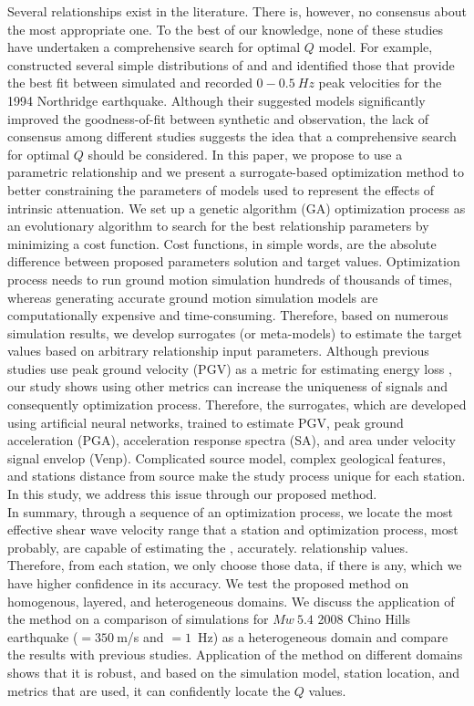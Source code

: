 Several  \qsvs{} relationships exist in the literature. There is, however, no consensus about the most appropriate one. To the best of our knowledge, none of these studies have undertaken a comprehensive search for optimal $Q$ model. For example, \citet{Olsen_2003_BSSA} constructed several simple distributions of  \qs{} and \qp{} and identified those that provide the best fit between simulated and recorded $0-0.5~Hz$ peak velocities for the 1994 Northridge earthquake. Although their suggested models significantly improved the goodness-of-fit between synthetic and observation, the lack of consensus among different studies suggests the idea that a comprehensive search for optimal $Q$ should be considered. In this paper, we propose to use a parametric \qsvs{} relationship and we present a surrogate-based optimization method to better constraining the parameters of models used to represent the effects of intrinsic attenuation. We set up a genetic algorithm (GA) optimization process as an evolutionary algorithm to search for the best \qsvs{} relationship parameters by minimizing a cost function.  Cost functions, in simple words, are the absolute difference between proposed parameters solution and target values. Optimization process needs to run ground motion simulation hundreds of thousands of times, whereas generating accurate ground motion simulation models are computationally expensive and time-consuming. Therefore, based on numerous simulation results, we develop surrogates (or meta-models) to estimate the target values based on arbitrary \qsvs{} relationship input parameters. Although previous studies use peak ground velocity (PGV) as a metric for estimating energy loss \citep[e.g., see ][{\color{red} needs more references.}]{Olsen_2003_BSSA}, our study shows using other metrics can increase the uniqueness of signals and consequently optimization process. Therefore, the surrogates, which are developed using artificial neural networks, trained to estimate PGV, peak ground acceleration (PGA), acceleration response spectra (SA), and area under velocity signal envelop (Venp). Complicated source model, complex geological features, and stations distance from source make the study process unique for each station. In this study, we address this issue through our proposed method. \\
In summary, through a sequence of an optimization process, we locate the most effective shear wave velocity range that a station and optimization process, most probably, are capable of estimating the \qsvs{}, accurately.  relationship values. Therefore, from each station, we only choose those data, if there is any, which we have higher confidence in its accuracy. We test the proposed method on homogenous, layered, and heterogeneous domains.  We discuss the application of the method on a comparison of simulations for $Mw~5.4$ 2008 Chino Hills earthquake (\vsmin$=350~$m/s and \fmax$=1$~Hz) as a heterogeneous domain and compare the results with previous studies. Application of the method on different domains shows that it is robust, and based on the simulation model, station location, and metrics that are used, it can confidently locate the $Q$ values. 
